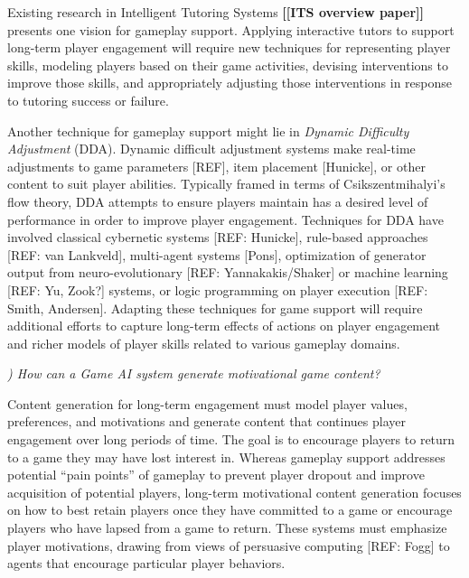 \documentclass[conference]{IEEEtran}
\newcounter{questionno}
\newcommand{\mytodo}[1]{\textbf{[[#1]]}}
\newcommand{\subsubsectionx}[1]{{\em {\arabic{questionno}) #1}}
	\addtocounter{questionno}{1}
	}
\begin{document}
Existing research in Intelligent Tutoring Systems \mytodo{ITS overview paper} presents one vision for gameplay support. 
Applying interactive tutors to support long-term player engagement will require new techniques for representing player skills, modeling players based on their game activities, devising interventions to improve those skills, and appropriately adjusting those interventions in response to tutoring success or failure. 

%

Another technique for gameplay support might lie in {\em Dynamic Difficulty Adjustment} (DDA).
Dynamic difficult adjustment systems make real-time adjustments to game parameters [REF], item placement [Hunicke], or other content to suit player abilities. 
Typically framed in terms of Csikszentmihalyi's flow theory, DDA attempts to ensure players maintain has a desired level of performance in order to improve player engagement. 
Techniques for DDA have involved classical cybernetic systems [REF: Hunicke], rule-based approaches [REF: van Lankveld], multi-agent systems [Pons], optimization of generator output from neuro-evolutionary [REF: Yannakakis/Shaker] or machine learning [REF: Yu, Zook?] systems, or logic programming on player execution [REF: Smith, Andersen]. Adapting these techniques for game support will require additional efforts to capture long-term effects of actions on player engagement and richer models of player skills related to various gameplay domains.

\subsubsectionx{How can a Game AI system generate motivational game content?}
%
Content generation for long-term engagement must model player values, preferences, and motivations and generate content that continues player engagement over long periods of time.
The goal is to encourage players to return to a game they may have lost interest in. 
Whereas gameplay support addresses potential ``pain points'' of gameplay to prevent player dropout and improve acquisition of potential players, long-term motivational content generation focuses on how to best retain players once they have committed to a game or encourage players who have lapsed from a game to return. 
These systems must emphasize player motivations, drawing from views of persuasive computing [REF: Fogg] to agents that encourage particular player behaviors. 
\end{document}
